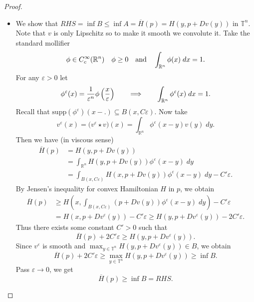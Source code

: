 \documentclass[12pt, oneside]{amsart}  	%
\begin{document}
\begin{proof}
\begin{itemize}
\item We show that $RHS = \inf B\le \inf A= \overline{H}(p)=H(y, p + Dv(y))$ in $\mathbb{T}^n$. Note that $v$ is only Lipschitz so to make it smooth we convolute it. Take the standard mollifier 
\begin{equation*}
\phi\in C^\infty_c(\mathbb{R}^n)\quad \phi \ge 0\quad\text{and}\quad \int_{\mathbb{R}^n} \phi(x)\;dx =1.
\end{equation*}
For any $\varepsilon>0$ let
\begin{equation*}
\phi^\varepsilon(x) = \frac{1}{\varepsilon^n}\phi\left(\frac{x}{\varepsilon} \right) \qquad\Longrightarrow\qquad   \int_{\mathbb{R}^n}\phi^\varepsilon(x)\;dx=1.
\end{equation*}
Recall that $\text{supp}(\phi^\varepsilon)(x-.) \subseteq B(x,C\varepsilon)$. Now take
\begin{equation*}
v^\varepsilon(x) = \Big(v^\varepsilon \star v\Big)(x) = \int_{\mathbb{R}^n} \phi^\varepsilon(x-y)v(y)\;dy.
\end{equation*}
Then we have (in viscous sense)
\begin{align*}
\overline{H}(p) &= H(y,p+Dv(y))\\
           &= \int_{\mathbb{R}^n} H(y,p+Dv(y))\phi^\varepsilon(x-y)\;dy\\
           &= \int_{B(x,C\varepsilon)} H(x,p+Dv(y))\phi^\varepsilon(x-y)\;dy  - C'\varepsilon.
\end{align*}
By Jensen's inequality for convex Hamiltonian $H$ in $p$, we obtain
\begin{align*}
\overline{H}(p) &\geq H\left(x, \int_{B(x,C\varepsilon)} (p+Dv(y))\phi^\varepsilon(x-y)\;dy\right) - C'\varepsilon\\
 		   &= H(x,p+Dv^\varepsilon(y)) - C'\varepsilon \geq H(y,p+Dv^\varepsilon(y)) - 2C'\varepsilon.
\end{align*}
Thus there exists some constant $C'>0$ such that 
\begin{equation*}
\overline{H}(p) + 2C'\varepsilon \geq H(y,p+Dv^\varepsilon(y)).
\end{equation*}
Since $v^\varepsilon$ is smooth and $\max_{y\in \mathbb{T}^n} H(y,p+Dv^\varepsilon(y))\in B$, we obtain
\begin{equation*}
\overline{H}(p) + 2C'\varepsilon \geq \max_{y\in \mathbb{T}^n} H(y,p+Dv^\varepsilon(y))\geq \inf B.
\end{equation*}
Pass $\varepsilon \longrightarrow 0$, we get
\begin{equation*}
\overline{H}(p) \geq \inf B = RHS.
\end{equation*}
\end{itemize}
\end{proof}
\end{document}

